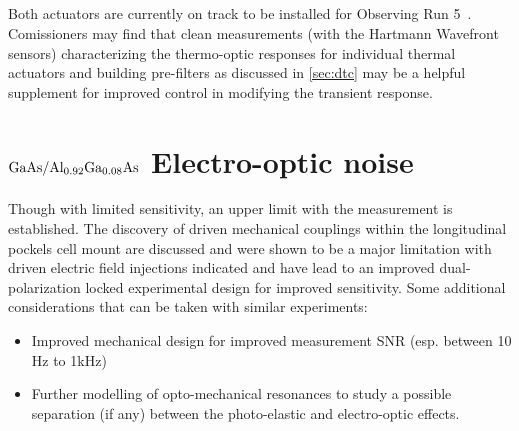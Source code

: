 \subsection*{}
Both actuators are currently on track to be installed for Observing Run 5~\cite{O5tcssummary}. Comissioners may find that clean measurements (with the Hartmann Wavefront sensors) characterizing the thermo-optic responses for individual thermal actuators and building pre-filters as discussed in \autoref{sec:dtc} may be a helpful supplement for improved control in modifying the transient response.

\section{\texorpdfstring{$\mathrm{GaAs} / \mathrm{Al_{0.92}Ga_{0.08}As}$}{gaas/algaas} Electro-optic noise}
Though with limited sensitivity, an upper limit with the measurement is established. The discovery of driven mechanical couplings within the longitudinal pockels cell mount are discussed and were shown to be a major limitation with driven electric field injections indicated and have lead to an improved dual-polarization locked experimental design for improved sensitivity. Some additional considerations that can be taken with similar experiments:

\begin{itemize}
	\item Improved mechanical design for improved measurement SNR (esp. between 10 Hz to 1kHz)
	\item Further modelling of opto-mechanical resonances to study a possible separation (if any) between the photo-elastic and electro-optic effects.  
\end{itemize}
